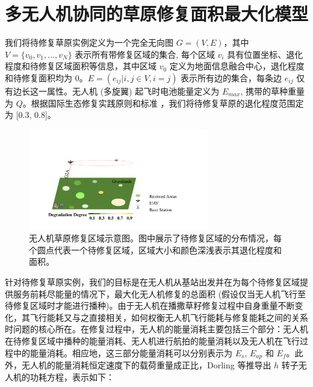 \documentclass[AutoFakeBold]{LZUThesis}
\begin{document}


\chapter{多无人机协同的草原修复面积最大化模型}

我们将待修复草原实例定义为一个完全无向图 $G = (V, E)$，其中 $V = \{v_0, v_1, ..., v_N \}$ 表示所有带修复区域的集合, 每个区域 $v_i$ 具有位置坐标、退化程度和待修复区域面积等信息，其中区域 $v_0$ 定义为地面信息融合中心，退化程度和待修复面积均为 0。$E = (e_{ij} |i, j \in V, i = j)$ 表示所有边的集合，每条边 $e_{ij}$ 仅有边长这一属性。无人机 (多旋翼) 起飞时电池能量定义为 $E_{max}$, 携带的草种重量为 $Q$。根据国际生态修复实践原则和标准\cite{gann2019international} ，我们将待修复草原的退化程度范围定为 [0.3, 0.8]。

\begin{figure}[htbp]
	\centering
	\includegraphics[width=0.7\textwidth]{figures/Restored-Areas.pdf}
	\caption{无人机草原修复区域示意图。图中展示了待修复区域的分布情况，每个圆点代表一个待修复区域，区域大小和颜色深浅表示其退化程度和面积。}
	\label{fig:restored-areas}
\end{figure}

针对待修复草原实例，我们的目标是在无人机从基站出发并在为每个待修复区域提供服务前耗尽能量的情况下，最大化无人机修复的总面积 (假设仅当无人机飞行至待修复区域时才能进行播种)。由于无人机在播撒草籽修复过程中自身重量不断变化，其飞行能耗又与之直接相关，如何权衡无人机飞行能耗与修复能耗之间的关系时问题的核心所在。在修复过程中，无人机的能量消耗主要包括三个部分：无人机在待修复区域中播种的能量消耗、无人机进行航拍的能量消耗以及无人机在飞行过程中的能量消耗。相应地，这三部分能量消耗可以分别表示为 $E_s$, $E_{ap}$ 和 $E_f$。此外，无人机的能量消耗恒定速度下的载荷重量成正比，Dorling\cite{dorling2016vehicle} 等推导出 $h$ 转子无人机的功耗方程，表示如下：
\end{document}
